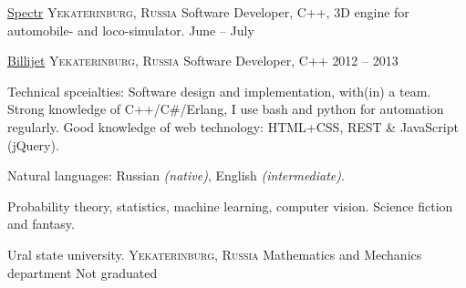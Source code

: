\documentclass[10pt,a4paper]{article}
\begin{document}
\headedsection
  {\href{http://www.rc-spectr.ru/}{Spectr}}
  {\textsc{Yekaterinburg, Russia}} {%
  \headedsubsection
    {Software Developer, C++, 3D engine for automobile- and loco-simulator.}
    {June  -- July }
    {}
}

\spacedhrule{0.5em}{-0.4em}


\headedsection
  {\href{http://billijet.ru/}{Billijet}}
  {\textsc{Yekaterinburg, Russia}} {%
  \headedsubsection
    {Software Developer, C++}
    {2012 -- 2013}
    {}
}

\spacedhrule{0.5em}{-0.4em}


\inlineheadsection  %
  {Technical spceialties:}
  {Software design and implementation, with(in) a team. Strong knowledge of C++/C\#/Erlang, I use bash and python for automation regularly. Good knowledge of web technology: HTML+CSS, REST \& JavaScript (jQuery).}

\vspace{0.5em}
\inlineheadsection
  {Natural languages:}
  {Russian \emph{(native)}, English \emph{(intermediate)}.}


\spacedhrule{1.6em}{-0.4em}


\inlineheadsection
  {}
  {Probability theory, statistics, machine learning, computer vision. Science fiction and fantasy.}

\spacedhrule{1.6em}{-0.4em}


\headedsection
  {Ural state university.}
  {\textsc{Yekaterinburg, Russia}} {%
  \headedsubsection
    {Mathematics and Mechanics department}
    {Not graduated}
    {\bodytext{}}
}
\end{document}
